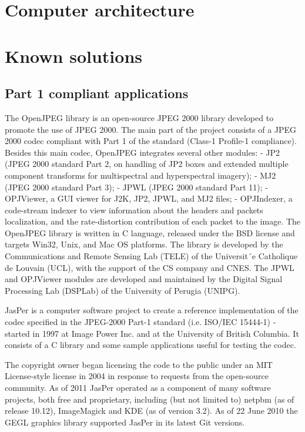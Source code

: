 \section{Computer architecture}

    

\section{Known solutions}

\subsection{Part 1 compliant applications}

The OpenJPEG library is an open-source JPEG 2000 library developed to promote the use
of JPEG 2000. The main part of the project consists of a JPEG 2000 codec compliant with
Part 1 of the standard (Class-1 Profile-1 compliance). Besides this main codec, OpenJPEG
integrates several other modules:
- JP2 (JPEG 2000 standard Part 2, on handling of JP2 boxes and extended multiple
component transforms for multispectral and hyperspectral imagery);
- MJ2 (JPEG 2000 standard Part 3);
- JPWL (JPEG 2000 standard Part 11);
- OPJViewer, a GUI viewer for J2K, JP2, JPWL, and MJ2 files;
- OPJIndexer, a code-stream indexer to view information about the headers and packets
localization, and the rate-distortion contribution of each packet to the image.
The OpenJPEG library is written in C language, released under the BSD license and
targets Win32, Unix, and Mac OS platforms. The library is developed by the Communications
and Remote Sensing Lab (TELE) of the Universit´e Catholique de Louvain (UCL),
with the support of the CS company and CNES. The JPWL and OPJViewer modules
are developed and maintained by the Digital Signal Processing Lab (DSPLab) of the
University of Perugia (UNIPG). \cite{jpeg_suite}

JasPer is a computer software project to create a reference implementation of the codec specified in the JPEG-2000 Part-1 standard (i.e. ISO/IEC 15444-1) - started in 1997 at Image Power Inc. and at the University of British Columbia. It consists of a C library and some sample applications useful for testing the codec.

The copyright owner began licensing the code to the public under an MIT License-style license in 2004 in response to requests from the open-source community. As of 2011 JasPer operated as a component of many software projects, both free and proprietary, including (but not limited to) netpbm (as of release 10.12), ImageMagick and KDE (as of version 3.2). As of 22 June  2010 the GEGL graphics library supported JasPer in its latest Git versions.

